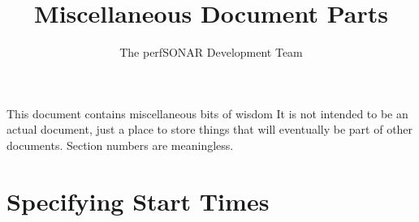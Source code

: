 \documentclass[10pt,titlepage]{article}
\title{Miscellaneous Document Parts}
\author{The perfSONAR Development Team}
\begin{document}
\maketitle





This document contains miscellaneous bits of wisdom It is not intended
to be an actual document, just a place to store things that will
eventually be part of other documents.  Section numbers are meaningless.

\section{Specifying Start Times}


\end{document}
